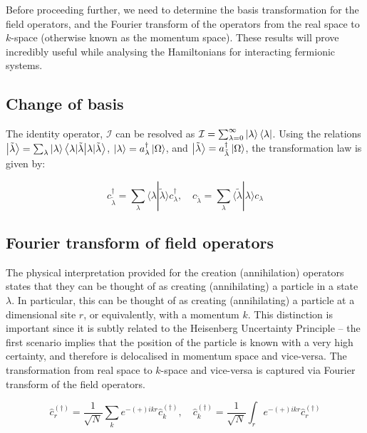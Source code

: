 Before proceeding further, we need to determine the basis transformation for the field operators, and the Fourier transform of the operators from the real space to $k$-space (otherwise known as the momentum space). These results will prove incredibly useful while analysing the Hamiltonians for interacting fermionic systems. \\

\clearpage

\subsection{Change of basis}

The identity operator, $\mathcal{I}$ can be resolved as $\mathcal{I} = \sum_{\lambda=0}^{\infty}\ket{\lambda}\bra{\lambda}$. Using the relations $\ket{\tilde{\lambda}} = \sum_{\lambda}\ket{\lambda}\braket{\lambda|\tilde{\lambda}}$, $\ket{\lambda} = a_{\lambda}^{\dagger}\ket{\Omega}$, and $\ket{\tilde{\lambda}} = a_{\tilde{\lambda}}^{\dagger} \ket{\Omega}$, the transformation law is given by:

\begin{equation}
    c_{\tilde{\lambda}}^{\dagger} = \sum_{\lambda} \langle \lambda|\tilde{\lambda} \rangle c_{\lambda}^{\dagger}, \quad c_{\tilde{\lambda}} = \sum_{\lambda} \langle \tilde{\lambda}|\lambda \rangle c_{\lambda}
\end{equation}

\subsection{Fourier transform of field operators}

The physical interpretation provided for the creation (annihilation) operators states that they can be thought of as creating (annihilating) a particle in a state $\lambda$. In particular, this can be thought of as creating (annihilating) a particle at a dimensional site $r$, or equivalently, with a momentum $k$. This distinction is important since it is subtly related to the Heisenberg Uncertainty Principle -- the first scenario implies that the position of the particle is known with a very high certainty, and therefore is delocalised in momentum space and vice-versa. The transformation from real space to $k$-space and vice-versa is captured via Fourier transform of the field operators.

\begin{equation}
    \hat{c}_{r}^{(\dagger)} = \frac{1}{\sqrt{N}}\sum_{k}e^{-(+)ikr} \hat{c}_{k}^{(\dagger)}, \quad \hat{c}_{k}^{(\dagger)} = \frac{1}{\sqrt{N}}\int_{r}e^{-(+)ikr} \hat{c}_{r}^{(\dagger)}
\end{equation}

